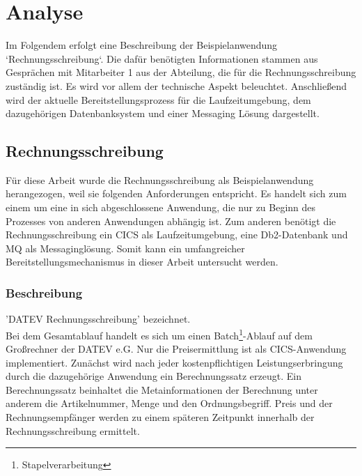 \chapter{Analyse}\label{ch:analyse}
Im Folgendem erfolgt eine Beschreibung der Beispielanwendung `Rechnungsschreibung`.
Die dafür benötigten Informationen stammen aus Gesprächen mit Mitarbeiter 1 aus der Abteilung, die für die Rechnungsschreibung zuständig ist.
Es wird vor allem der technische Aspekt beleuchtet.
Anschließend wird der aktuelle Bereitstellungsprozess für die Laufzeitumgebung, dem dazugehörigen Datenbanksystem und einer Messaging Lösung dargestellt.

\section{Rechnungsschreibung}
Für diese Arbeit wurde die Rechnungsschreibung als Beispielanwendung herangezogen, weil sie folgenden Anforderungen entspricht.
Es handelt sich zum einem um eine in sich abgeschlossene Anwendung, die nur zu Beginn des Prozesses von anderen Anwendungen abhängig ist.
Zum anderen benötigt die Rechnungsschreibung ein CICS als Laufzeitumgebung, eine Db2-Datenbank und MQ als Messaginglösung.
Somit kann ein umfangreicher Bereitstellungsmechanismus in dieser Arbeit untersucht werden.

\subsection{Beschreibung}\label{rechBesch}'DATEV Rechnungsschreibung' bezeichnet.\\
Bei dem Gesamtablauf handelt es sich um einen Batch\footnote{Stapelverarbeitung}-Ablauf auf dem Großrechner der DATEV e.G.
Nur die Preisermittlung ist als CICS-Anwendung implementiert.
Zunächst wird nach jeder kostenpflichtigen Leistungserbringung durch die dazugehörige Anwendung ein Berechnungssatz erzeugt.
Ein Berechnungssatz beinhaltet die Metainformationen der Berechnung unter anderem die Artikelnummer, Menge und den Ordnungsbegriff.
Preis und der Rechnungsempfänger werden zu einem späteren Zeitpunkt innerhalb der Rechnungsschreibung ermittelt.

